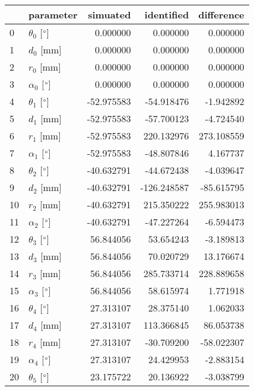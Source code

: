 \documentclass{standalone}%
\begin{document}
%
\normalsize%
\begin{tabular}{llrrr}
\toprule
{} &                 parameter &   simuated &  identified &  difference \\
\midrule
0  &  $\theta_{0}$ [$\degree$] &   0.000000 &    0.000000 &    0.000000 \\
1  &              $d_{0}$ [mm] &   0.000000 &    0.000000 &    0.000000 \\
2  &              $r_{0}$ [mm] &   0.000000 &    0.000000 &    0.000000 \\
3  &  $\alpha_{0}$ [$\degree$] &   0.000000 &    0.000000 &    0.000000 \\
4  &  $\theta_{1}$ [$\degree$] & -52.975583 &  -54.918476 &   -1.942892 \\
5  &              $d_{1}$ [mm] & -52.975583 &  -57.700123 &   -4.724540 \\
6  &              $r_{1}$ [mm] & -52.975583 &  220.132976 &  273.108559 \\
7  &  $\alpha_{1}$ [$\degree$] & -52.975583 &  -48.807846 &    4.167737 \\
8  &  $\theta_{2}$ [$\degree$] & -40.632791 &  -44.672438 &   -4.039647 \\
9  &              $d_{2}$ [mm] & -40.632791 & -126.248587 &  -85.615795 \\
10 &              $r_{2}$ [mm] & -40.632791 &  215.350222 &  255.983013 \\
11 &  $\alpha_{2}$ [$\degree$] & -40.632791 &  -47.227264 &   -6.594473 \\
12 &  $\theta_{3}$ [$\degree$] &  56.844056 &   53.654243 &   -3.189813 \\
13 &              $d_{3}$ [mm] &  56.844056 &   70.020729 &   13.176674 \\
14 &              $r_{3}$ [mm] &  56.844056 &  285.733714 &  228.889658 \\
15 &  $\alpha_{3}$ [$\degree$] &  56.844056 &   58.615974 &    1.771918 \\
16 &  $\theta_{4}$ [$\degree$] &  27.313107 &   28.375140 &    1.062033 \\
17 &              $d_{4}$ [mm] &  27.313107 &  113.366845 &   86.053738 \\
18 &              $r_{4}$ [mm] &  27.313107 &  -30.709200 &  -58.022307 \\
19 &  $\alpha_{4}$ [$\degree$] &  27.313107 &   24.429953 &   -2.883154 \\
20 &  $\theta_{5}$ [$\degree$] &  23.175722 &   20.136922 &   -3.038799 \\

\end{tabular}
\end{document}
